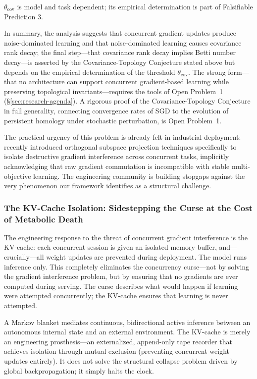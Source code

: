 \documentclass{article}
\begin{document}
$\theta_{\text{cov}}$ is model and task dependent; its empirical determination is part of Falsifiable Prediction 3.

\medskip
\noindent In summary, the analysis suggests that concurrent gradient updates produce noise-dominated learning and that noise-dominated learning causes covariance rank decay; the final step---that covariance rank decay implies Betti number decay---is asserted by the Covariance-Topology Conjecture stated above but depends on the empirical determination of the threshold $\theta_{\text{cov}}$. The strong form---that no architecture can support concurrent gradient-based learning while preserving topological invariants---requires the tools of Open Problem~1 (\S\ref{sec:research-agenda}). A rigorous proof of the Covariance-Topology Conjecture in full generality, connecting convergence rates of SGD to the evolution of persistent homology under stochastic perturbation, is Open Problem~1.

The practical urgency of this problem is already felt in industrial deployment: \citet{Zhao2026GEMS} recently introduced orthogonal subspace projection techniques specifically to isolate destructive gradient interference across concurrent tasks, implicitly acknowledging that raw gradient commutation is incompatible with stable multi-objective learning. The engineering community is building stopgaps against the very phenomenon our framework identifies as a structural challenge.



\subsubsection{The KV-Cache Isolation: Sidestepping the Curse at the Cost of Metabolic Death}

The engineering response to the threat of concurrent gradient interference is the KV-cache: each concurrent session is given an isolated memory buffer, and---crucially---all weight updates are prevented during deployment. The model runs inference only. This completely eliminates the concurrency curse---not by solving the gradient interference problem, but by ensuring that no gradients are ever computed during serving. The curse describes what would happen if learning were attempted concurrently; the KV-cache ensures that learning is never attempted.

A Markov blanket \citep{Kirchhoff2018markov} mediates continuous, bidirectional active inference between an autonomous internal state and an external environment. The KV-cache is merely an engineering prosthesis---an externalized, append-only tape recorder that achieves isolation through mutual exclusion (preventing concurrent weight updates entirely). It does not solve the structural collapse problem driven by global backpropagation; it simply halts the clock.
\end{document}
